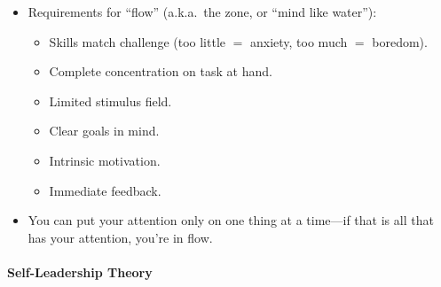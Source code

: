 \documentclass{article}
\begin{document}
\begin{itemize}
 \item Requirements for ``flow'' (a.k.a.\ the zone, or ``mind like water''):
 \begin{itemize}
  \item Skills match challenge (too little $=$ anxiety, too much $=$ boredom).
  \item Complete concentration on task at hand.
  \item Limited stimulus field.
  \item Clear goals in mind.
  \item Intrinsic motivation.
  \item Immediate feedback.
 \end{itemize}
 \item You can put your attention only on one thing at a time---if that is all that has your attention, you're in flow.
\end{itemize}

\paragraph{Self-Leadership Theory}
\end{document}
